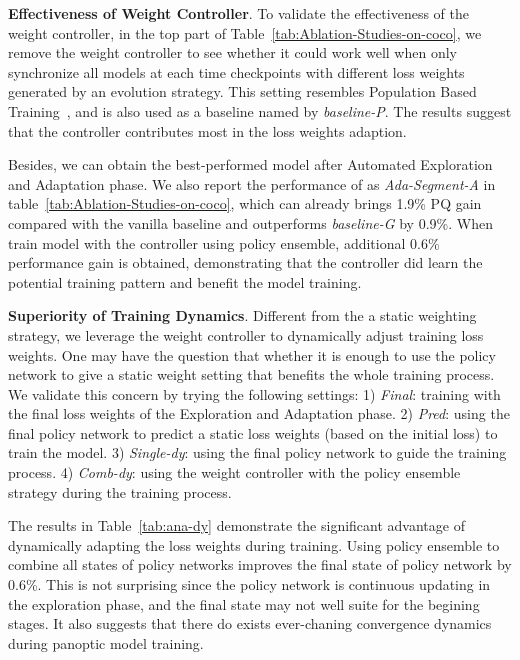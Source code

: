 \documentclass[letterpaper]{article} \usepackage{aaai21}  \usepackage{times}  \usepackage{helvet} \usepackage{courier}  \usepackage[hyphens]{url}  \usepackage{graphicx} \urlstyle{rm} \def\UrlFont{\rm}  \usepackage{natbib}  \usepackage{caption} \frenchspacing  \setlength{\pdfpagewidth}{8.5in}  \setlength{\pdfpageheight}{11in}
\begin{document}
 \noindent
 \textbf{Effectiveness of Weight Controller}.
 To validate the effectiveness of the weight controller, in the top part of 
 Table~\ref{tab:Ablation-Studies-on-coco},
 we remove the weight controller to see whether it could work well when
 only synchronize all models at each time checkpoints with different loss weights 
 generated by an evolution strategy. 
 This setting resembles Population Based Training~\cite{jaderberg2017pbt}, 
 and is also used as a baseline named by \textit{baseline-P}. 
 The results suggest that the controller contributes most 
 in the loss weights adaption.

 Besides, we can obtain the best-performed model  after Automated Exploration 
 and Adaptation phase. We also 
 report the performance of  as \textit{Ada-Segment-A} in table~\ref{tab:Ablation-Studies-on-coco}, 
 which can already brings 1.9\% PQ gain compared with the vanilla baseline and outperforms 
 \textit{baseline-G} by 0.9\%. When train model with 
 the controller using policy ensemble, additional 0.6\% performance gain is obtained, demonstrating 
 that the controller did learn the potential training pattern and benefit the model training. 
 
 


 \noindent
 \textbf{Superiority of Training Dynamics}.
 Different from the a static weighting strategy, we leverage the weight controller 
 to dynamically adjust training loss weights. 
 One may have the question that whether it is enough to use the policy network to give a 
 static weight setting that benefits the whole training process. We validate this concern
 by trying the following settings:
 1) \textit{Final}: training with the final loss weights  of the Exploration and Adaptation phase. 
2) \textit{Pred}: using the final policy network to predict a static loss weights (based on the initial loss) 
 to train the model.  
 3) \textit{Single-dy}: using the final policy network to guide the training process.
 4) \textit{Comb-dy}: using the weight controller with the policy ensemble strategy 
 during the training process. 
 
 The results in Table~\ref{tab:ana-dy} demonstrate the significant advantage of
 dynamically adapting the loss weights during training. 
 Using policy ensemble to combine all states of policy networks improves the 
 final state of policy network  by 0.6\%. This is not surprising since the policy network 
 is continuous updating in the exploration phase, and the final state may not well suite for 
 the begining stages. It also suggests that there do exists ever-chaning convergence dynamics 
 during panoptic model training.
\end{document}
